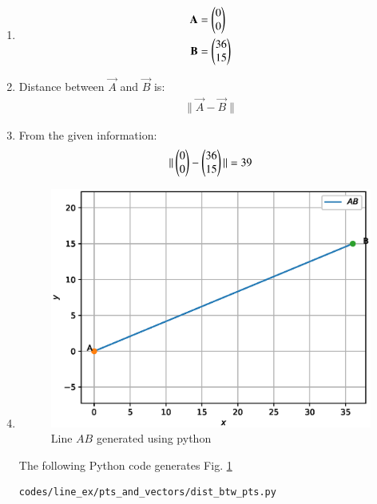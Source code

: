\renewcommand{\theequation}{\theenumi}
\begin{enumerate}

\item \begin{align}
\mathbf{A} &=\begin{pmatrix}0\\0\end{pmatrix} \label{eq:constr_a_pts_and_vectors}\\
\mathbf{B} &=\begin{pmatrix}36\\15\end{pmatrix} \label{eq:constr_b_pts_and_vectors}
\end{align}

\item Distance between $\vec{A}$ and $\vec{B}$ is:
\begin{align}
\| \vec{A} - \vec{B} \| 
\end{align}

\item From the given information:
\begin{align}
\| \begin{pmatrix}0\\0\end{pmatrix} - \begin{pmatrix}36\\15\end{pmatrix} \| = 39
\end{align}

\item \begin{figure}[!ht]
\centering
\includegraphics[width=\columnwidth]{./figs/line_ex/pts_and_vectors/dist_bt_pts.eps}
\caption{Line $AB$ generated using python}
\label{fig:dist_btw_pts2_pts_and_vectors}
\end{figure} 

The following Python code generates Fig. \ref{fig:dist_btw_pts2_pts_and_vectors}

\begin{lstlisting}
codes/line_ex/pts_and_vectors/dist_btw_pts.py
\end{lstlisting}

\end{enumerate}





